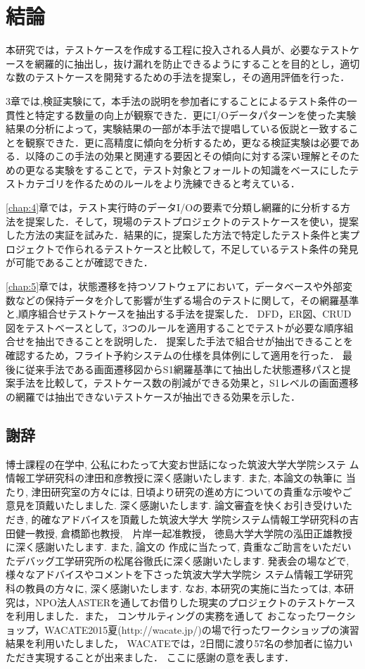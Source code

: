 \chapter{結論}

本研究では，テストケースを作成する工程に投入される人員が、必要なテストケースを網羅的に抽出し，抜け漏れを防止できるようにすることを目的とし，適切な数のテストケースを開発するための手法を提案し，その適用評価を行った．

3章では,検証実験にて，本手法の説明を参加者にすることによるテスト条件の一貫性と特定する数量の向上が観察できた．更にI/Oデータパターンを使った実験結果の分析によって，実験結果の一部が本手法で提唱している仮説と一致することを観察できた．更に高精度に傾向を分析するため，更なる検証実験は必要である．以降のこの手法の効果と関連する要因とその傾向に対する深い理解とそのための更なる実験をすることで，テスト対象とフォールトの知識をベースにしたテストカテゴリを作るためのルールをより洗練できると考えている．


\ref{chap:4}章では，テスト実行時のデータI/Oの要素で分類し網羅的に分析する方法を提案した．そして，現場のテストプロジェクトのテストケースを使い，提案した方法の実証を試みた．結果的に，提案した方法で特定したテスト条件と実プロジェクトで作られるテストケースと比較して，不足しているテスト条件の発見が可能であることが確認できた．

\ref{chap:5}章では，状態遷移を持つソフトウェアにおいて，データベースや外部変数などの保持データを介して影響が生ずる場合のテストに関して，その網羅基準と,順序組合せテストケースを抽出する手法を提案した．
DFD，ER図、CRUD図をテストベースとして，3つのルールを適用することでテストが必要な順序組合せを抽出できることを説明した．
提案した手法で組合せが抽出できることを確認するため，フライト予約システムの仕様を具体例にして適用を行った．
最後に従来手法である画面遷移図からS1網羅基準にて抽出した状態遷移パスと提案手法を比較して，テストケース数の削減ができる効果と，S1レベルの画面遷移の網羅では抽出できないテストケースが抽出できる効果を示した．

\section{謝辞}
博士課程の在学中, 公私にわたって大変お世話になった筑波大学大学院システ
ム情報工学研究科の津田和彦教授に深く感謝いたします. また, 本論文の執筆に
当たり, 津田研究室の方々には, 日頃より研究の進め方についての貴重な示唆やご
意見を頂戴いたしました. 深く感謝いたします.
論文審査を快くお引き受けいただき, 的確なアドバイスを頂戴した筑波大学大
学院システム情報工学研究科の吉田健一教授, 倉橋節也教授,　片岸一起准教授， 徳島大学大学院の泓田正雄教授に深く感謝いたします. また, 論文の
作成に当たって, 貴重なご助言をいただいたデバッグ工学研究所の松尾谷徹氏に深く感謝いたします.
発表会の場などで, 様々なアドバイスやコメントを下さった筑波大学大学院シ
ステム情報工学研究科の教員の方々に, 深く感謝いたします.
なお, 本研究の実施に当たっては,
本研究は，NPO法人ASTERを通してお借りした現実のプロジェクトのテストケースを利用しました．また，
コンサルティングの実務を通して
おこなったワークショップ，WACATE2015夏(http://wacate.jp/)の場で行ったワークショップの演習結果を利用いたしました，
WACATEでは，2日間に渡り57名の参加者に協力いただき実現することが出来ました．
ここに感謝の意を表します．
